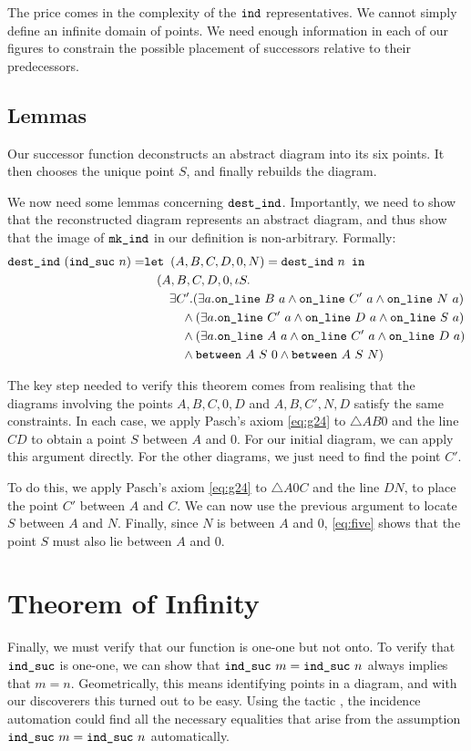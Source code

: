 The price comes in the complexity of the $\texttt{ind}$ representatives. We cannot simply define an infinite domain of points. We need enough information in each of our figures to constrain the possible placement of successors relative to their predecessors.

\subsection{Lemmas}
Our successor function deconstructs an abstract diagram into its six points. It then chooses the unique point $S$, and finally rebuilds the diagram. 

We now need some lemmas concerning $\texttt{dest\_ind}$. Importantly, we need to show that the reconstructed diagram represents an abstract diagram, and thus show that the image of $\texttt{mk\_ind}$ in our definition is non-arbitrary. Formally:
\begin{align*}
\texttt{dest\_ind}\ (\texttt{ind\_suc}\ n) = & \texttt{let } (A,B,C,D,0,N) = \texttt{dest\_ind}\ n \texttt{ in}\\
&\quad (A,B,C,D,0,\iota S.\\
&\quad\quad \exists C'. (\exists a. \texttt{on\_line}\ B\ a \wedge \texttt{on\_line}\ C'\ a \wedge \texttt{on\_line}\ N\ a)\\
&\qquad\quad \wedge (\exists a. \texttt{on\_line}\ C'\ a \wedge \texttt{on\_line}\ D\ a \wedge \texttt{on\_line}\ S\ a)\\
&\qquad\quad \wedge (\exists a. \texttt{on\_line}\ A\ a \wedge \texttt{on\_line}\ C'\ a \wedge \texttt{on\_line}\ D\ a)\\
&\qquad\quad \wedge \texttt{between}\ A\ S\ 0 \wedge \texttt{between}\ A\ S\ N)
\end{align*} 

The key step needed to verify this theorem comes from realising that the diagrams involving the points $A,B,C,0,D$ and $A,B,C',N,D$ satisfy the same constraints. In each case, we apply Pasch's axiom \eqref{eq:g24} to $\triangle AB0$ and the line $CD$ to obtain a point $S$ between $A$ and $0$. For our initial diagram, we can apply this argument directly. For the other diagrams, we just need to find the point $C'$.

To do this, we apply Pasch's axiom \eqref{eq:g24} to $\triangle A0C$ and the line $DN$, to place the point $C'$ between $A$ and $C$. We can now use the previous argument to locate $S$ between $A$ and $N$. Finally, since $N$ is between $A$ and $0$, \ref{eq:five} shows that the point $S$ must also lie between $A$ and $0$. 

\section{Theorem of Infinity}
Finally, we must verify that our function is one-one but not onto. To verify that $\texttt{ind\_suc}$ is one-one, we can show that $\texttt{ind\_suc}\ m = \texttt{ind\_suc}\ n$ always implies that \mbox{$m = n$}. Geometrically, this means identifying points in a diagram, and with our discoverers this turned out to be easy. Using the tactic , the incidence automation could find all the necessary equalities that arise from the assumption $\texttt{ind\_suc}\ m = \texttt{ind\_suc}\ n$ automatically.

